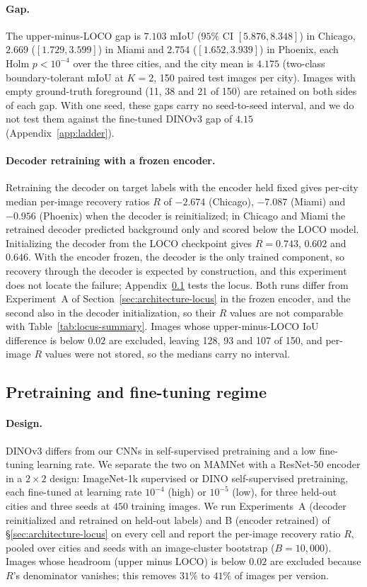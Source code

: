 \paragraph{Gap.} The upper-minus-LOCO gap is $7.103$ mIoU ($95\%$ CI $[5.876, 8.348]$) in
Chicago, $2.669$ ($[1.729, 3.599]$) in Miami and $2.754$ ($[1.652, 3.939]$) in Phoenix, each
Holm $p < 10^{-4}$ over the three cities, and the city mean is $4.175$ (two-class
boundary-tolerant mIoU at $K{=}2$, 150 paired test images per city). Images with empty
ground-truth foreground (11, 38 and 21 of 150) are retained on both sides of each gap. With
one seed, these gaps carry no seed-to-seed interval, and we do not test them against the
fine-tuned DINOv3 gap of $4.15$ (Appendix~\ref{app:ladder}).

\paragraph{Decoder retraining with a frozen encoder.} Retraining the decoder on target
labels with the encoder held fixed gives per-city median per-image recovery ratios $R$ of
$-2.674$ (Chicago), $-7.087$ (Miami) and $-0.956$ (Phoenix) when the decoder is
reinitialized; in Chicago and Miami the retrained decoder predicted background only and
scored below the LOCO model. Initializing the decoder from the LOCO checkpoint gives
$R = 0.743$, $0.602$ and $0.646$. With the encoder frozen, the decoder is the only trained
component, so recovery through the decoder is expected by construction, and this
experiment does not locate the failure; Appendix~\ref{app:armL-expA} tests the locus. Both
runs differ from Experiment~A of Section~\ref{sec:architecture-locus} in the frozen encoder,
and the second also in the decoder initialization, so their $R$ values are not comparable
with Table~\ref{tab:locus-summary}. Images whose upper-minus-LOCO IoU difference is below
$0.02$ are excluded, leaving 128, 93 and 107 of 150, and per-image $R$ values were not
stored, so the medians carry no interval.

\subsection{Pretraining and fine-tuning regime}
\label{app:armL-expA}

\paragraph{Design.} DINOv3 differs from our CNNs in self-supervised
pretraining and a low fine-tuning learning rate.  We separate the two on MAMNet
with a ResNet-50 encoder in a $2\times2$ design: ImageNet-1k supervised or DINO
self-supervised pretraining, each fine-tuned at learning rate $10^{-4}$ (high) or
$10^{-5}$ (low), for three held-out cities and three seeds at $450$ training
images.  We run Experiments~A (decoder reinitialized and retrained on held-out
labels) and B (encoder retrained) of \S\ref{sec:architecture-locus} on every
cell and report the per-image recovery ratio $R$, pooled over cities and seeds
with an image-cluster bootstrap ($B{=}10{,}000$).  Images whose headroom (upper
minus LOCO) is below $0.02$ are excluded because $R$'s denominator vanishes; this
removes $31\%$ to $41\%$ of images per version.

